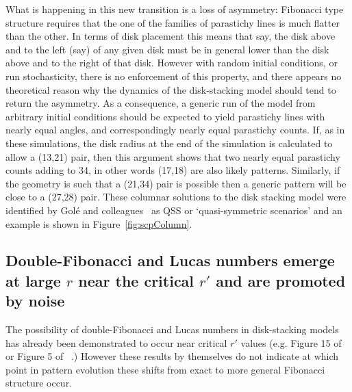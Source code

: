 What is happening in this new transition is a loss of asymmetry:  Fibonacci type structure requires that the one of the families of parastichy lines is much flatter than the other. In terms of disk placement this means that say, the disk above and to the left (say) of any given disk must be in general lower than the disk above and to the right of that disk. However with random initial conditions, or run stochasticity, there is no enforcement of this property, and there appears no theoretical reason why the dynamics of the disk-stacking model should tend to return the asymmetry. As a consequence, a generic run of the model from arbitrary initial conditions should be expected to yield parastichy lines with nearly equal angles, and correspondingly nearly equal parastichy counts. If, as in these simulations, the disk radius at the end of the simulation is calculated to allow a (13,21) pair, then this argument shows that two nearly equal parastichy counts adding to 34, in other words (17,18) are also likely patterns. Similarly, if the geometry is such that a (21,34) pair is possible then a generic pattern will be close to a (27,28) pair. These columnar solutions to the disk stacking model were identified by Gol\'e and colleagues~\cite{goleFibonacciQuasisymmetricPhyllotaxis2016} as QSS or `quasi-symmetric scenarios'  and an example is shown in Figure~\ref{fig:scpColumn}.

\subsection{Double-Fibonacci and Lucas numbers emerge at large $r$ near the critical $r'$ and are promoted by noise}
The possibility of double-Fibonacci and Lucas numbers in disk-stacking models has already been demonstrated to occur near critical $r'$ values (e.g. Figure 15 of~\cite{goleFibonacciQuasisymmetricPhyllotaxis2016} or Figure 5 of ~\cite{yonekuraMathematicalModelStudies2019}.) However these results by themselves do not indicate at which point in pattern evolution these shifts from exact to more general Fibonacci structure occur. 

